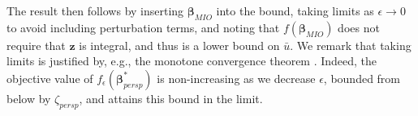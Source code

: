 \documentclass[ijoc,noblindrev]{informs3} %
\newcommand{\ag}[1]{{\color{black}#1}}
\begin{document}
{The result then follows by inserting $\bm{\beta}_{MIO}$ into the bound, taking limits as $\epsilon \rightarrow 0$ to avoid including perturbation terms, and noting that $f(\bm{\beta}_{MIO})$ does not require that $\bm{z}$ is integral, and thus is a lower bound on $\bar{u}$. We remark that taking limits is justified by, e.g., the monotone convergence theorem \citep{grimmett2020probability}. Indeed, the objective value of $f_\epsilon(\bm{\beta}_{persp}^*)$ is non-increasing as we decrease $\epsilon$, bounded from below by $\zeta_{persp}$, and attains this bound in the limit. 
}
\end{document}
